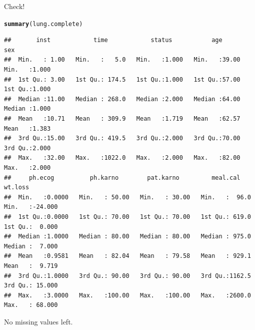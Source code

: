 \documentclass[unknownkeysallowed]{beamer}\usepackage[]{graphicx}\usepackage[]{color}
\makeatletter
\newcommand{\hlstd}[1]{\textcolor[rgb]{0.345,0.345,0.345}{#1}}%
\newcommand{\hlkwd}[1]{\textcolor[rgb]{0.737,0.353,0.396}{\textbf{#1}}}%
\newenvironment{kframe}{%
 \def\at@end@of@kframe{}%
 \ifinner\ifhmode%
  \def\at@end@of@kframe{\end{minipage}}%
  \begin{minipage}{\columnwidth}%
 \fi\fi%
 \def\FrameCommand##1{\hskip\@totalleftmargin \hskip-\fboxsep
 \colorbox{shadecolor}{##1}\hskip-\fboxsep
     \hskip-\linewidth \hskip-\@totalleftmargin \hskip\columnwidth}%
 \MakeFramed {\advance\hsize-\width
   \@totalleftmargin\z@ \linewidth\hsize
   \@setminipage}}%
 {\par\unskip\endMakeFramed%
 \at@end@of@kframe}
\newenvironment{knitrout}{}{} %
\makeatother
\begin{document}
\begin{frame}[fragile]{Check!}
  
\begin{knitrout}\tiny
{}\color{fgcolor}\begin{kframe}
\begin{alltt}
\hlkwd{summary}\hlstd{(lung.complete)}
\end{alltt}
\begin{verbatim}
##       inst            time            status           age             sex       
##  Min.   : 1.00   Min.   :   5.0   Min.   :1.000   Min.   :39.00   Min.   :1.000  
##  1st Qu.: 3.00   1st Qu.: 174.5   1st Qu.:1.000   1st Qu.:57.00   1st Qu.:1.000  
##  Median :11.00   Median : 268.0   Median :2.000   Median :64.00   Median :1.000  
##  Mean   :10.71   Mean   : 309.9   Mean   :1.719   Mean   :62.57   Mean   :1.383  
##  3rd Qu.:15.00   3rd Qu.: 419.5   3rd Qu.:2.000   3rd Qu.:70.00   3rd Qu.:2.000  
##  Max.   :32.00   Max.   :1022.0   Max.   :2.000   Max.   :82.00   Max.   :2.000  
##     ph.ecog          ph.karno        pat.karno         meal.cal         wt.loss       
##  Min.   :0.0000   Min.   : 50.00   Min.   : 30.00   Min.   :  96.0   Min.   :-24.000  
##  1st Qu.:0.0000   1st Qu.: 70.00   1st Qu.: 70.00   1st Qu.: 619.0   1st Qu.:  0.000  
##  Median :1.0000   Median : 80.00   Median : 80.00   Median : 975.0   Median :  7.000  
##  Mean   :0.9581   Mean   : 82.04   Mean   : 79.58   Mean   : 929.1   Mean   :  9.719  
##  3rd Qu.:1.0000   3rd Qu.: 90.00   3rd Qu.: 90.00   3rd Qu.:1162.5   3rd Qu.: 15.000  
##  Max.   :3.0000   Max.   :100.00   Max.   :100.00   Max.   :2600.0   Max.   : 68.000
\end{verbatim}
\end{kframe}
\end{knitrout}

No missing values left.
  
\end{frame}
\end{document}
